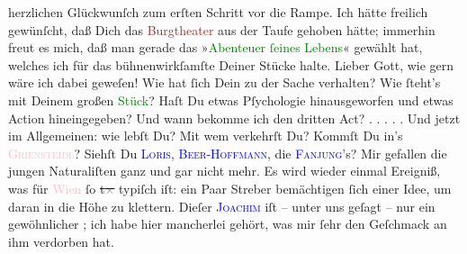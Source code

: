 \documentclass[twoside=false,titlepage=false,open=any, parskip=never, fontsize=12pt, headings=small, chapterprefix=false, appendixprefix=false]{scrbook}
\newcommand{\strikeout}[1]{\sout{#1}}
\newcommand{\dotsfive}{%
.\kern\ellipsisgap 
.\kern\ellipsisgap
.\kern\ellipsisgap
.\kern\ellipsisgap 
.\kern\ellipsisgap 
\relax}
\newcommand{\pbposition}{\depth}
\newcommand{\pb}{\nobreak\hspace{0pt}\raisebox{-0.1em}{\raisebox{\pbposition}{\textnormal{|}}}\nobreak\hspace{0pt}}
\begin{document}
               herzlichen Glückwunſch zum erſten Schritt vor die Rampe. Ich hätte freilich
               gewünſcht, daß Dich das \textcolor{brown}{Burgtheater}{}\ledrightnote{\textcolor{brown}{Burgtheater}} aus der Taufe
               gehoben hätte; immerhin freut es mich, daß man gerade das »\textcolor{green}{Abenteuer ſeines Lebens}{}\ledrightnote{\textcolor{green}{Das Abenteuer seines Lebens}}« gewählt hat, welches ich für das
               bühnenwirkſamſte Deiner Stücke halte. Lieber Gott, wie gern wäre ich dabei geweſen!
               Wie hat ſich Dein \label{K_L02661-4v}\label{K_L02661-4h}
               zu der Sache verhalten? Wie ſteht’s mit Deinem großen \textcolor{green}{Stück}{}? Haſt Du etwas
               Pſychologie hinausgeworfen und etwas Action hineingegeben? Und wann bekomme ich den
               dritten Act? {\dotsfive}\pend
           \pstart
           Und jetzt im Allgemeinen: wie lebſt Du? Mit wem verkehrſt Du? Kommſt Du in’s \textsc{\textcolor{pink}{Griensteidl}{}\ledrightnote{\textcolor{pink}{Café Griensteidl}}}? Siehſt Du \textsc{\textcolor{blue}{Loris}{}}, {\pb}\textsc{\textcolor{blue}{Beer-Hoffmann}{}\ledrightnote{\textcolor{blue}{Richard Beer-Hofmann}}}, die \textsc{\textcolor{blue}{Fanjung}{}}’s?\pend
           \pstart
           Mir gefallen die jungen Naturaliſten ganz und gar nicht mehr. Es wird wieder einmal
               Ereigniß, was für \textcolor{pink}{Wien}{}\ledrightnote{\textcolor{pink}{Wien}} ſo \strikeout{t\textcolor{gray}{×}} typiſch iſt: ein Paar Streber bemächtigen ſich einer Idee, um daran in die
               Höhe zu klettern. Dieſer \textsc{\textcolor{blue}{Joachim}{}\ledrightnote{\textcolor{blue}{Jaques Joachim}}} iſt – unter uns geſagt – nur ein gewöhnlicher \label{K_L02661-5v}\label{K_L02661-5h}; ich habe
               hier mancherlei gehört, was mir ſehr den Geſchmack an ihm verdorben hat.\pend
\end{document}
